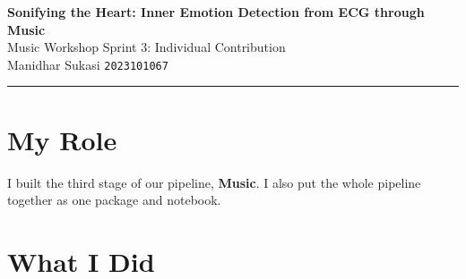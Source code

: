 \documentclass[11pt,a4paper]{article}
\begin{document}
\begin{center}
  {\Large\bfseries Sonifying the Heart: Inner Emotion Detection from ECG through Music}\\[6pt]
  Music Workshop Sprint 3: Individual Contribution\\[8pt]
  {\large Manidhar Sukasi} \quad \texttt{2023101067}
\end{center}
\noindent\rule{\textwidth}{0.4pt}

\section{My Role}
I built the third stage of our pipeline, \textbf{Music}. I also put the whole pipeline together
as one package and notebook.

\section{What I Did}
\end{document}
